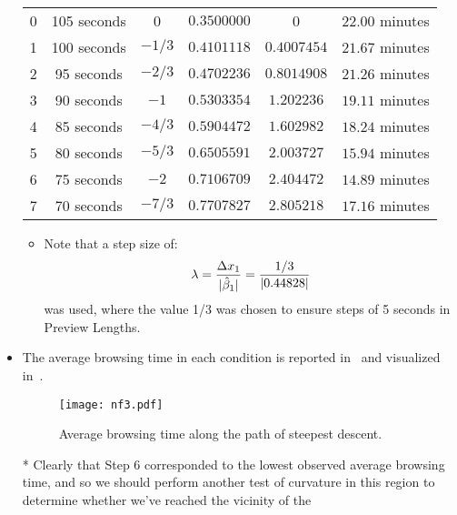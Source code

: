 \begin{itemize}
\begin{table}[!htbp]
\begin{tabular}{cccccc}
                        \midrule 0    & 105 seconds    & 0        & $0.3500000$  & 0           & $22.00$ minutes       \\
                        1             & 100 seconds    & $-1 / 3$ & $0.4101118$  & $0.4007454$ & $21.67$ minutes       \\
                        2             & 95 seconds     & $-2 / 3$ & $0.4702236$  & $0.8014908$ & $21.26$ minutes       \\
                        3             & 90 seconds     & $-1$     & $0.5303354$  & $1.202236$  & $19.11$ minutes       \\
                        4             & 85 seconds     & $-4 / 3$ & $0.5904472$  & $1.602982$  & $18.24$ minutes       \\
                        5             & 80 seconds     & $-5 / 3$ & $0.6505591$  & $2.003727$  & $15.94$ minutes       \\
                        6             & 75 seconds     & $-2$     & $0.7106709$  & $2.404472$  & $14.89$ minutes       \\
                        7             & 70 seconds     & $-7 / 3$ & $0.7707827$  & $2.805218$  & $17.16$ minutes       \\
                        \bottomrule
                  \end{tabular}
            \end{table}
            \begin{itemize}
                  \item Note that a step size of:
                        \[ \lambda=\frac{\Delta x_1}{\lvert\hat{\beta}_1\rvert}=\frac{1/3}{\lvert0.44828\rvert}  \]
                        was used, where the value 1/3 was chosen to ensure steps of 5 seconds in Preview Lengths.
            \end{itemize}
      \item The average browsing time in each condition is reported in~ and visualized in~.
            \begin{figure}[!htbp]
                  \centering
                  \texttt{[image: nf3.pdf]}
                  \caption{Average browsing time along the path of steepest descent.}\label{fig:nf3}
            \end{figure}
      \item[*] Clearly that Step 6 corresponded to the lowest observed average browsing time, and so we should
            perform another test of curvature in this region to determine whether we've reached the vicinity of the

\end{itemize}
